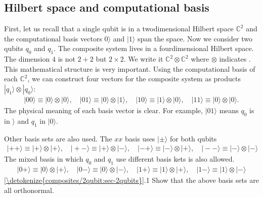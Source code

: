 \documentclass[letterpaper,10pt,english]{jupyterBook}
\begin{document}
\subsection{Hilbert space and computational basis}
\label{\detokenize{composites/2qubit:hilbert-space-and-computational-basis}}
\sphinxAtStartPar
First, let us recall that a single qubit is in a two\sphinxhyphen{}dimensional Hilbert space \(\mathbb{C}^2\) and the computational basis vectors \(0\rangle\) and \(|1\rangle\) span the space. Now we consider two qubits \(q_0\) and \(q_1\). The composite system lives in a four\sphinxhyphen{}dimensional Hilbert space.  The dimension \(4\) is not \(2+2\) but \(2 \times 2\).  We write it \(\mathbb{C}^2 \otimes \mathbb{C}^2\) where \(\otimes\) indicates .  This mathematical structure is very important. Using the computational basis of each \(\mathbb{C}^2\), we can construct four  vectors for the composite system as products \(|q_1\rangle \otimes |q_0\rangle\):
\begin{equation}\label{equation:composites/2qubit:computational-basis-q2}
\begin{split}
|00\rangle \equiv |0\rangle \otimes |0\rangle, \quad |01\rangle \equiv |0\rangle \otimes |1\rangle, \quad |10\rangle \equiv |1\rangle \otimes |0\rangle, \quad |11\rangle \equiv |0\rangle \otimes |0\rangle.
\end{split}
\end{equation}
\sphinxAtStartPar
The physical meaning of each basis vector is clear. For example, \(|01\rangle\) means \(q_0\) is in \(\rangle\) and \(q_1\) in \(|0\rangle\).

\sphinxAtStartPar
Other basis sets are also used.  The \(xx\) basis uses \(|\pm\rangle\) for both qubits
\begin{equation*}
\begin{split}
|++\rangle \equiv |+\rangle \otimes |+\rangle, \quad |+-\rangle \equiv |+\rangle \otimes |-\rangle, \quad |-+\rangle \equiv |-\rangle \otimes |+\rangle, \quad |--\rangle \equiv |-\rangle \otimes |-\rangle
\end{split}
\end{equation*}
\sphinxAtStartPar
The mixed basis in which \(q_0\) and \(q_1\) use different basis kets is also allowed.
\begin{equation*}
\begin{split}
|0+\rangle \equiv |0\rangle \otimes |+\rangle, \quad |0-\rangle \equiv |0\rangle \otimes |-\rangle, \quad |1+\rangle \equiv |1\rangle \otimes |+\rangle, \quad |1-\rangle \equiv |1\rangle \otimes |-\rangle
\end{split}
\end{equation*}
\sphinxAtStartPar
{} \hyperref[\detokenize{composites/2qubit:sec-2qubits}]{\ref{\detokenize{composites/2qubit:sec-2qubits}}}.1    Show that the above basis sets are all orthonormal.
\end{document}
